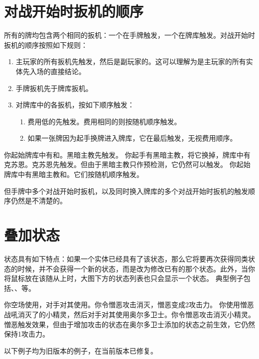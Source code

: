 \section{对战开始时扳机的顺序}

所有的牌均包含两个相同的扳机：一个在手牌触发，一个在牌库触发。对战开始时扳机的顺序按照如下规则：

\begin{enumerate}
    \item 主玩家的所有扳机先触发，然后是副玩家的。这可以理解为是主玩家的所有实体先入场的直接结论。
    \item 手牌扳机先于牌库扳机。
    \item 对牌库中的各扳机，按如下顺序触发：
    \begin{enumerate}
        \item 费用低的先触发。费用相同的则按随机顺序触发。
        \item  如果一张牌因为起手换牌进入牌库，它在最后触发，无视费用顺序。
    \end{enumerate}
\end{enumerate}

\example 你起始牌库中有和。黑暗主教先触发。
\example 你起手有黑暗主教，将它换掉，牌库中有克苏恩。克苏恩先触发。但由于黑暗主教只作预检测，它仍然可以触发。
\example 你起始牌库中有黑暗主教和。它们按随机顺序触发。

但手牌中多个对战开始时扳机，以及同时换入牌库的多个对战开始时扳机的触发顺序仍然是不清楚的。

\section{叠加状态}

 状态具有如下特点：如果一个实体已经具有了该状态，那么它将要再次获得同类状态的时候，并不会获得一个新的状态，而是改为修改已有的那个状态。此外，当你将鼠标放在该随从上时，大图下方的状态列表也只会显示一个状态。
\example 典型例子包括、、等。

\example 你空场使用，对手对其使用。你令憎恶攻击消灭，憎恶变成2攻击力。
\example 你使用憎恶战吼消灭了的小精灵，然后对手对其使用奥尔多卫士。你令憎恶攻击消灭小精灵。憎恶触发效果，但由于增加攻击的状态在奥尔多卫士添加的状态之前生效，它仍然保持1攻击力。

以下例子均为旧版本的例子，在当前版本已修复。

